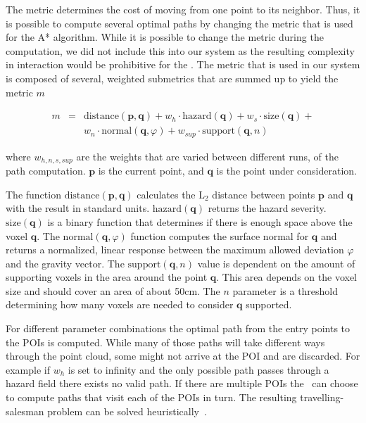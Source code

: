 The metric determines the cost of moving from one point to its neighbor. Thus, it is possible to compute several optimal paths by changing the metric that is used for the A* algorithm. While it is possible to change the metric during the computation, we did not include this into our system as the resulting complexity in interaction would be prohibitive for the \IC. The metric that is used in our system is composed of several, weighted submetrics that are summed up to yield the metric $m$

\begin{eqnarray*}
m & = & \textrm{distance}(\mathbf{p},\mathbf{q}) + w_h \cdot \textrm{hazard}(\mathbf{q}) + w_s \cdot \textrm{size}(\mathbf{q}) + \\
  & & w_n \cdot \textrm{normal}(\mathbf{q},\varphi) + w_{sup} \cdot \textrm{support}(\mathbf{q},n)
\end{eqnarray*}

\noindent where $w_{h,n,s,sup}$ are the weights that are varied between different runs, of the path computation. $\mathbf{p}$ is the current point, and $\mathbf{q}$ is the point under consideration.

The function $\textrm{distance}(\mathbf{p},\mathbf{q})$ calculates the L$_2$ distance between points $\mathbf{p}$ and $\mathbf{q}$ with the result in standard units. $\textrm{hazard}(\mathbf{q})$ returns the hazard severity. $\textrm{size}(\mathbf{q})$ is a binary function that determines if there is enough space above the voxel $\mathbf{q}$. The $\textrm{normal}(\mathbf{q},\varphi)$ function computes the surface normal for $\mathbf{q}$ and returns a normalized, linear response between the maximum allowed deviation $\varphi$ and the gravity vector. The $\mathrm{support}(\mathbf{q},n)$ value is dependent on the amount of supporting voxels in the area around the point $\mathbf{q}$. This area depends on the voxel size and should cover an area of about 50cm. The $n$ parameter is a threshold determining how many voxels are needed to consider $\mathbf{q}$ supported.

For different parameter combinations the optimal path from the entry points to the POIs is computed. While many of those paths will take different ways through the point cloud, some might not arrive at the POI and are discarded. For example if $w_h$ is set to infinity and the only possible path passes through a hazard field there exists no valid path. If there are multiple POIs the \IC\ can choose to compute paths that visit each of the POIs in turn. The resulting travelling-salesman problem can be solved heuristically~\cite{4569756}.


